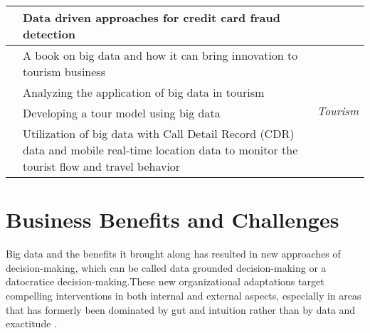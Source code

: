 \begin{center}
\begin{longtable}{|p{4cm}|p{8cm}|p{1cm}|}
        \cite{Tran2018}            & Data driven approaches for credit card fraud detection                                                                                        &                                             \\

        \hline
        \cite{Sigala2019}          & A book on big data and how it can bring innovation to tourism business                                                                        & \multirow{5}{*}{\begin{turn}{-90} \textit{Tourism} \end{turn}}  \\

        \cite{Zhang2019a}          & Analyzing the application of big data in tourism                                                                                              &                                             \\

        \cite{Dezfouli2018}        & Developing a tour model using big data                                                                                                        &                                             \\

        \cite{Qin2019}             & Utilization of big data with Call Detail Record (CDR) data and mobile real-time location data to monitor the tourist flow and travel behavior &                                             \\

        \hline
    \end{longtable}
\end{center}

\section{Business Benefits and Challenges}

Big data and the  benefits it brought along has resulted in new approaches of decision-making, which can be called data grounded decision-making \cite{Comuzzi2016} or a datocratice decision-making.These new organizational adaptations target compelling interventions in both internal and external aspects, especially in areas that has formerly been dominated by gut and intuition rather than by data and exactitude \cite{Wamba2017}.

